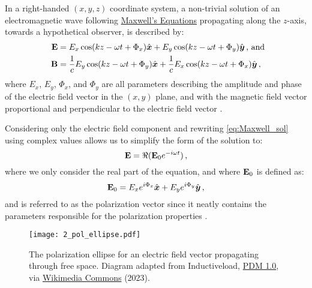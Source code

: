\enlargethispage{-3\baselineskip}

In a right-handed $(x, y, z)$ coordinate system, a non-trivial solution of an electromagnetic wave following \hyperref[eq:Maxwell]{Maxwell's Equations} propagating along the $z$-axis, towards a hypothetical observer, is described by:
\begin{equation} \label{eq:Maxwell_sol}
    \begin{aligned}
        \matr{E} &= E_{x} \cos(kz - \omega t + \Phi_{x}) \hat{\boldsymbol{x}} +
        E_{y} \cos(kz - \omega t + \Phi_{y}) \hat{\boldsymbol{y}} \rlap{\,,\ and}\\
        \matr{B} &= \frac{1}{c} E_{y} \cos(kz - \omega t + \Phi_{y}) \hat{\boldsymbol{x}} +
        \frac{1}{c} E_{x} \cos(kz - \omega t + \Phi_{x}) \hat{\boldsymbol{y}}\,,
    \end{aligned}
\end{equation}
where $E_{x}$, $E_{y}$, $\Phi_{x}$, and $\Phi_{y}$ are all parameters describing the amplitude and phase of the electric field vector in the $(x, y)$ plane, and with the magnetic field vector proportional and perpendicular to the electric field vector \citep{Griffiths}.

Considering only the electric field component and rewriting \autoref{eq:Maxwell_sol} using complex values allows us to simplify the form of the solution to:
\begin{equation} \label{eq:E_field_vector}
    \mathbf{E} = \Re(\mathbf{E}_{0} e^{-i \omega t})\,,
\end{equation}
where we only consider the real part of the equation, and where $\mathbf{E}_{0}$ is defined as:
\begin{equation} \label{eq:pol_vector}
    \mathbf{E}_{0} = E_{x} e^{i \Phi_{x}} \hat{\boldsymbol{x}} +
    E_{y} e^{i \Phi_{y}} \hat{\boldsymbol{y}}\,,
\end{equation}
and is referred to as the polarization vector since it neatly contains the parameters responsible for the polarization properties \citep{pol_phys}.

\begin{figure}[t]
    \centering
    \texttt{[image: 2\_pol\_ellipse.pdf]}
    \caption{
        The polarization ellipse for an electric field vector propagating through free space.
        Diagram adapted from Inductiveload, \protect\href{https://creativecommons.org/publicdomain/mark/1.0/}{PDM 1.0}, via \protect\href{https://commons.wikimedia.org/wiki/File:Polarisation_ellipse2.svg}{Wikimedia Commons} (2023).
    }
    \label{fig:pol_ellipse}
\end{figure}

